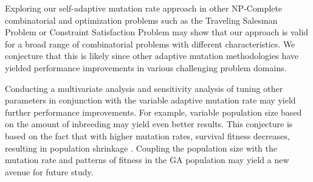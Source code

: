 \documentclass[conference]{IEEEtran}
\begin{document}
Exploring our self-adaptive mutation rate approach in other NP-Complete combinatorial and optimization problems such as the Traveling Salesman Problem or Constraint Satisfaction Problem may show that our approach is valid for a broad range of combinatorial problems with different characteristics. We conjecture that this is likely since other adaptive mutation methodologies have yielded performance improvements in various challenging problem domains.

Conducting a multivariate analysis and sensitivity analysis of tuning other parameters in conjunction with the variable adaptive mutation rate may yield further performance improvements. For example, variable population size based on the amount of inbreeding may yield even better results. This conjecture is based on the fact that with higher mutation rates, survival fitness decreases, resulting in population shrinkage \cite{cit:9}. Coupling the population size with the mutation rate and patterns of fitness in the GA population may yield a new avenue for future study.




%
%
%


\def\V{\rm vol.~}
\def\N{no.~}
\def\pp{pp.~}
\def\Pot{\it Proc. }
\def\IJCNN{\it IEEE World Congress On Computational Intelligence\rm }
\def\ACC{\it Beijing International Convention Center\rm }
\def\SMC{\it IEEE Trans. Systems\rm , \it Man\rm , and \it Cybernetics\rm } 
\end{document}
